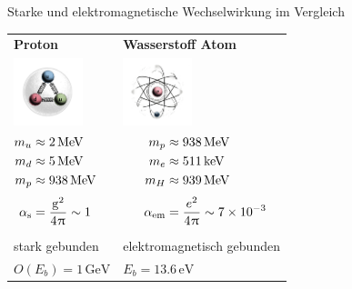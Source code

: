 \documentclass[10pt]{beamer}
\begin{document}
\begin{frame}{Starke und elektromagnetische Wechselwirkung im Vergleich}
	\hspace*{-0.5em}
	\begin{minipage}{\textwidth}
	\begin{table}[ht]
	\centering
		\begin{tabular}{C{0.45\framewidth} C{0.45\framewidth}}
			\hspace{-0.6em}\textbf{Proton}&
			\textbf{Wasserstoff Atom}\\
			\hspace{-0.6em}\includegraphics[width=2cm]{graphics/proton.png}&
			\includegraphics[width=2cm]{graphics/hydrogen.png}\\
			
			$\begin{aligned}
				\phantom{}m_u&\approx 2 \,\mathrm{MeV}\\ %
				m_d&\approx 5\,\mathrm{MeV}\\ %
				m_p&\approx 938 \,\mathrm{MeV}\\ %
				\alpha_\mathrm{s}&=\frac{\mathrm{g}^2}{4\piu}\sim 1 \vphantom{\Bigg\{}
			\end{aligned}$&
			$\begin{aligned}
				\phantom{1111}m_p&\approx 938 \,\mathrm{MeV}\\ %
				m_e&\approx 511\,\mathrm{keV}\\
				m_H&\approx 939\, \mathrm{MeV}\\ %
				\alpha_\mathrm{em}&=\frac{e^2}{4\piu}\sim7\times 10^{-3} \vphantom{\Bigg\{}
			\end{aligned}$\\
	stark gebunden & elektromagnetisch gebunden\\
	$O(E_b)=1\,\mathrm{GeV}$&$E_b=13.6\,\mathrm{eV}$\\
	\end{tabular}
	\end{table}
	\end{minipage}
	

\end{frame}
\end{document}
